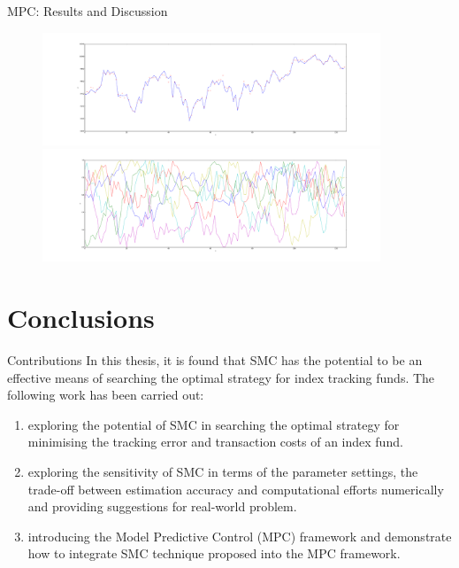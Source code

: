 \documentclass[handout]{beamer}
\begin{document}
\begin{frame}{MPC: Results and Discussion}

   \begin{figure}
    \centering
    \includegraphics[width = 0.9\textwidth, height=0.4\textheight]{figure/DAXMPC-y-2-long.pdf}\\
    \includegraphics[width = 0.9\textwidth, height=0.4\textheight]{figure/DAXMPC-u-2-long.pdf}
  \end{figure}
\end{frame}

\section{Conclusions}
\begin{frame}{Contributions}
In this thesis, it is found that SMC has the potential to be an effective means of searching the optimal strategy for index tracking funds. The following work has been carried out:
\begin{enumerate}
\item exploring the potential of SMC in searching the optimal strategy for minimising the tracking error and transaction costs of an index fund. 
\item exploring the sensitivity of SMC in terms of the parameter settings, the trade-off between estimation accuracy and computational efforts numerically and providing suggestions for real-world problem.
\item introducing the Model Predictive Control (MPC) framework and demonstrate how to integrate SMC technique proposed into the MPC framework.
\end{enumerate}
\end{frame}
\end{document}
